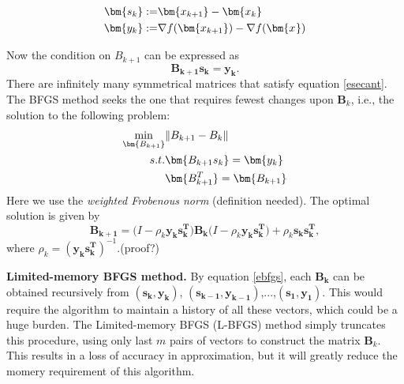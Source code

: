 \begin{equation}
\aligned
\bm{s_k} :=& \bm{x_{k+1}} - \bm{x_{k}}\\
\bm{y_k} :=& \nabla f(\bm{x_{k+1}}) - \nabla f(\bm{x_{}})\\
\endaligned
\end{equation}

Now the condition on $B_{k+1}$ can be expressed as
\begin{equation}\label{esecant}
\bm{B_{k+1}s_k} = \bm{y_k}.
\end{equation}
There are infinitely many symmetrical matrices that satisfy equation \eqref{esecant}. The BFGS method seeks the one that requires fewest changes upon $\bm B_k$, i.e., the solution to the following problem:
\begin{equation}
\aligned
\min_{\bm{B_{k+1}}}&\|B_{k+1} - B_k\|\\
s.t.&\bm{B_{k+1}s_k} = \bm{y_k}\\
&\bm{B_{k+1}^T} = \bm {B_{k+1}}
\endaligned
\end{equation}
Here we use the \textit{weighted Frobenous norm} {(\color{red}definition needed)}. The optimal solution is given by
\begin{equation}
\label{ebfgs}
\bm{B_{k+1}} = \big(I - \rho_k\bm{y_ks_k^T}\big)\bm{B_k}\big(I - \rho_k\bm{y_ks_k^T}\big)+\rho_k\bm{s_ks_k^T},
\end{equation}
where $\rho_k = (\bm{y_ks_k^T})^{-1}.${\color{red}(proof?)}

{\bf Limited-memory BFGS method.} By equation \eqref{ebfgs}, each $\bm{B_k}$ can be obtained recursively from $(\bm{s_k, y_k})$, $(\bm{s_{k-1}, y_{k-1}})$,...,$(\bm{s_1, y_1})$. This would require the algorithm to maintain a history of all these vectors, which could be a huge burden. The Limited-memory BFGS (L-BFGS) method simply truncates this procedure, using only last $m$ pairs of vectors to construct the matrix $\bm B_k$. This results in a loss of accuracy in approximation, but it will greatly reduce the momery requirement of this algorithm.




